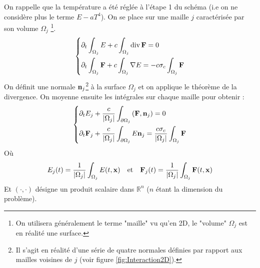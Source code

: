On rappelle que la température a été réglée à l'étape 1 du schéma (i.e on ne considère plus le terme $E-aT^4$). On se place sur une maille $j$ caractérisée par son volume $\Omega_j$ \footnote{On utilisera généralement le terme "maille" vu qu'en 2D, le "volume" $\Omega_j$ est en réalité une surface.}.
\begin{equation*} 
    \begin{dcases}
    \partial_t \int_{\Omega_j} E + c \int_{\Omega_j} \operatorname{div} \mathbf{F}  = 0\\
    \partial_t \int_{\Omega_j} \mathbf{F} + c \int_{\Omega_j} \nabla E = -c \sigma_c \int_{\Omega_j} \mathbf{F} 
    \end{dcases}   
\end{equation*}
On définit une normale $\mathbf{n}_j$\footnote{Il s'agit en réalité d'une série de quatre normales définies par rapport aux mailles voisines de $j$ (voir figure \ref{fig:Interaction2D}).} à la surface $\Omega_j$ et on applique le théorème de la divergence. On moyenne ensuite les intégrales sur chaque maille pour obtenir :
\begin{equation} 
    \begin{dcases}
    \partial_t E_j + \frac{c}{\left|\Omega_j\right|} \int_{\partial\Omega_j} \left( \mathbf{F}, \mathbf{n}_j  \right) = 0\\
    \partial_t \mathbf{F}_j + \frac{c}{\left|\Omega_j\right|} \int_{\partial\Omega_j}  E \mathbf{n}_j = \frac{c \sigma_c}{\left|\Omega_j\right|} \int_{\Omega_j} \mathbf{F}
    \end{dcases}   
\label{eqn:VolFin}
\end{equation}
Où $$ E_j(t) = \frac{1}{\left|\Omega_j\right|} \int_{\Omega_j} E(t,\mathbf{x}) \quad \text{et} \quad \mathbf{F}_j(t) = \frac{1}{\left|\Omega_j\right|} \int_{\Omega_j} \mathbf{F}(t,\mathbf{x}) $$
Et $(\cdot,\cdot)$ désigne un produit scalaire dans $\mathbb{R}^n$ ($n$ étant la dimension du problème).

